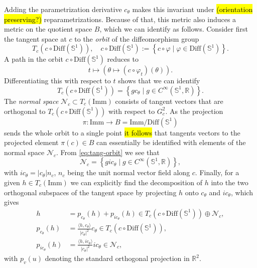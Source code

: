 \documentclass[a4,danish]{article}
\theoremstyle{break}
\theoremstyle{definition}
\theoremstyle{Break}
\newcommand{\R}{\mathbb{R}}
\newcommand{\I}{\text{Imm}}
\renewcommand{\S}{\mathbb{S}}
\renewcommand{\phi}{\varphi}
\begin{document}
Adding the parametrization derivative $c_{\theta}$ makes this
invariant under \hl{(orientation preserving?)}
reparametrizations. Because of that, this metric also induces a metric
on the quotient space $B$, which we can identify as follows. Consider
first the tangent space at $c$ to the \textit{orbit} of the diffeomorphism
group
\begin{equation*}
  T_c(c \circ \text{Diff}(\S^{1})), \quad c \circ
  \text{Diff}(\S^{1}) := 
  \left\{
    c \circ \phi \mid \phi \in \text{Diff}(\S^{1})
  \right\} .
\end{equation*}
A path in the orbit $c \circ \text{Diff}(\S^{1})$ reduces to
\begin{equation*}
  t \mapsto 
  \left(
    \theta \mapsto (c \circ \phi_t) (\theta)
\right).
\end{equation*}
Differentiating this with respect to $t$ shows that we can identify
\begin{equation}
  \label{eq:tang-orbit}
  T_c(c \circ \text{Diff}(\S^{1})) = 
  \left\{
    g c_{\theta} \mid g \in C^{\infty}(\S^1, \R)
  \right\}.
\end{equation}
The \textit{normal space} $\mathcal{N}_c \subset T_c(\I)$ consists of
tangent vectors that are orthogonal to $T_c(c \circ
\text{Diff}(\S^{1}))$ with respect to $G_c^2$. As the projection
\begin{equation*}
  \pi \colon \I \rightarrow B = \I/\text{Diff}(\S^{1})
\end{equation*}
sends the whole orbit to a single point \hl{it follows} that tangents
vectors to the projected element $\pi(c) \in B$ can essentially
be identified with elements of the normal space $\mathcal{N}_c$.
From \eqref{eq:tang-orbit} we see that
\begin{equation*}
  \mathcal{N}_c =
  \left\{
    g i c_{\theta} \mid g \in C^{\infty}(\S^1, \R)
  \right\},
\end{equation*}
with $i c_{\theta} = |c_{\theta}| n_c$, $n_c$ being the unit normal
vector field along $c$. Finally, for a given $h \in T_c(\I)$
we can explicitly find the decomposition of $h$ into the two orthogonal
subspaces of the tangent space by projecting $h$ onto $c_{\theta}$ and
$ic_{\theta}$, which gives
\begin{equation*}
  \begin{aligned}
    h &  = p_{c_{\theta}}(h) + p_{ic_{\theta}}(h)
    \in T_c(c \circ \text{Diff}(\S^{1})) \oplus \mathcal{N}_c
    ,\\
    p_{c_{\theta}}(h) & = 
    \frac{\langle h, c_{\theta}\rangle}{|c_{\theta}|^2} c_{\theta}
    \in T_c(c \circ \text{Diff}(\S^{1})), \\
    p_{ic_{\theta}}(h) & = 
    \frac{\langle h, ic_{\theta}\rangle}{|c_{\theta}|^2} ic_{\theta}
    \in \mathcal{N}_c,
  \end{aligned}
\end{equation*}
with $p_{v}(u)$ denoting the standard orthogonal projection in $\R^2$.
\end{document}
